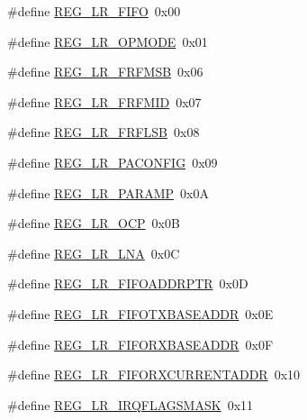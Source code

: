 \begin{DoxyCompactItemize}
\item 
\#define \mbox{\hyperlink{sx1276_regs-_lo_ra_8h_a0f3e3ea7703c7cb55e2fa4c02ebc6edb}{R\+E\+G\+\_\+\+L\+R\+\_\+\+F\+I\+FO}}~0x00
\item 
\#define \mbox{\hyperlink{sx1276_regs-_lo_ra_8h_ae13863a0cab88f39c29d875010dc5b25}{R\+E\+G\+\_\+\+L\+R\+\_\+\+O\+P\+M\+O\+DE}}~0x01
\item 
\#define \mbox{\hyperlink{sx1276_regs-_lo_ra_8h_a8649d29d6156853059baf0e882ee52ec}{R\+E\+G\+\_\+\+L\+R\+\_\+\+F\+R\+F\+M\+SB}}~0x06
\item 
\#define \mbox{\hyperlink{sx1276_regs-_lo_ra_8h_a63a5c5592931ff821f237f6393b54d95}{R\+E\+G\+\_\+\+L\+R\+\_\+\+F\+R\+F\+M\+ID}}~0x07
\item 
\#define \mbox{\hyperlink{sx1276_regs-_lo_ra_8h_a97328f9a41f18eb8a0888e003104626a}{R\+E\+G\+\_\+\+L\+R\+\_\+\+F\+R\+F\+L\+SB}}~0x08
\item 
\#define \mbox{\hyperlink{sx1276_regs-_lo_ra_8h_a8dfd910a5d3e587f7772052710ac3376}{R\+E\+G\+\_\+\+L\+R\+\_\+\+P\+A\+C\+O\+N\+F\+IG}}~0x09
\item 
\#define \mbox{\hyperlink{sx1276_regs-_lo_ra_8h_a5e5599cfeecea91ca7c5ba1e68c70882}{R\+E\+G\+\_\+\+L\+R\+\_\+\+P\+A\+R\+A\+MP}}~0x0A
\item 
\#define \mbox{\hyperlink{sx1276_regs-_lo_ra_8h_acdfdcf7cfc15f16c5c8d59fee923ca5f}{R\+E\+G\+\_\+\+L\+R\+\_\+\+O\+CP}}~0x0B
\item 
\#define \mbox{\hyperlink{sx1276_regs-_lo_ra_8h_a3a52a9b28aecbdddf291c14fe1b69b68}{R\+E\+G\+\_\+\+L\+R\+\_\+\+L\+NA}}~0x0C
\item 
\#define \mbox{\hyperlink{sx1276_regs-_lo_ra_8h_abdc4c3b5c640a1069f7be689ad5bd908}{R\+E\+G\+\_\+\+L\+R\+\_\+\+F\+I\+F\+O\+A\+D\+D\+R\+P\+TR}}~0x0D
\item 
\#define \mbox{\hyperlink{sx1276_regs-_lo_ra_8h_a317be2161e52b7ae141564e19598de85}{R\+E\+G\+\_\+\+L\+R\+\_\+\+F\+I\+F\+O\+T\+X\+B\+A\+S\+E\+A\+D\+DR}}~0x0E
\item 
\#define \mbox{\hyperlink{sx1276_regs-_lo_ra_8h_ad0c1f657286b341e8a305fcc546ff391}{R\+E\+G\+\_\+\+L\+R\+\_\+\+F\+I\+F\+O\+R\+X\+B\+A\+S\+E\+A\+D\+DR}}~0x0F
\item 
\#define \mbox{\hyperlink{sx1276_regs-_lo_ra_8h_ab571f7dfb8c742a652e427b983cc6962}{R\+E\+G\+\_\+\+L\+R\+\_\+\+F\+I\+F\+O\+R\+X\+C\+U\+R\+R\+E\+N\+T\+A\+D\+DR}}~0x10
\item 
\#define \mbox{\hyperlink{sx1276_regs-_lo_ra_8h_a2b50ca91ed7db2035a2183b37506eec8}{R\+E\+G\+\_\+\+L\+R\+\_\+\+I\+R\+Q\+F\+L\+A\+G\+S\+M\+A\+SK}}~0x11

\end{DoxyCompactItemize}
